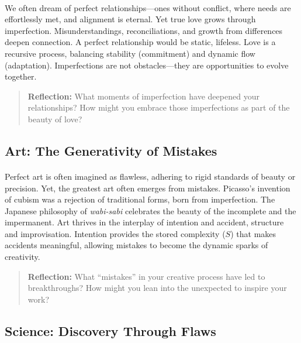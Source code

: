 \documentclass[12pt]{article}
\begin{document}
\paragraph{}
We often dream of perfect relationships—ones without conflict, where needs are effortlessly met, and alignment is eternal. Yet true love grows through imperfection. Misunderstandings, reconciliations, and growth from differences deepen connection. A perfect relationship would be static, lifeless. Love is a recursive process, balancing stability (commitment) and dynamic flow (adaptation). Imperfections are not obstacles—they are opportunities to evolve together.

\begin{quote}
\textbf{Reflection:}  
What moments of imperfection have deepened your relationships? How might you embrace those imperfections as part of the beauty of love?
\end{quote}

\subsection{Art: The Generativity of Mistakes}
\paragraph{}
Perfect art is often imagined as flawless, adhering to rigid standards of beauty or precision. Yet, the greatest art often emerges from mistakes. Picasso’s invention of cubism was a rejection of traditional forms, born from imperfection. The Japanese philosophy of \textit{wabi-sabi} celebrates the beauty of the incomplete and the impermanent. Art thrives in the interplay of intention and accident, structure and improvisation. Intention provides the stored complexity (\(S\)) that makes accidents meaningful, allowing mistakes to become the dynamic sparks of creativity.

\begin{quote}
\textbf{Reflection:}  
What “mistakes” in your creative process have led to breakthroughs? How might you lean into the unexpected to inspire your work?
\end{quote}

\subsection{Science: Discovery Through Flaws}
\end{document}
